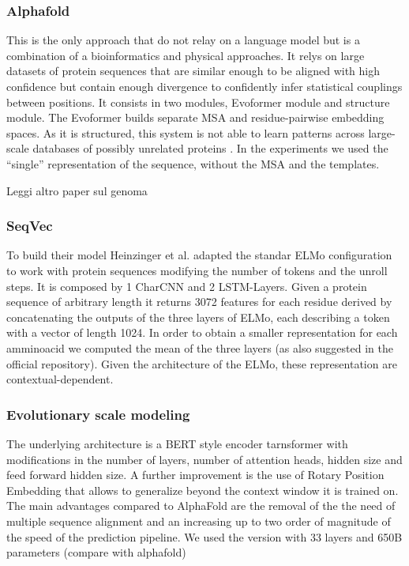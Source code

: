 \documentclass[12pt, letterpaper, twocolumn]{article}
\begin{document}
\subsubsection{Alphafold \cite{jumper2021highly}}
This is the only approach that do not relay on a language model but is a combination of a bioinformatics and physical approaches.
It relys on large datasets of protein sequences that are similar enough to be aligned with high confidence but contain enough divergence to confidently infer statistical couplings between positions. It consists in two modules, Evoformer module and structure module. The Evoformer builds separate MSA and residue-pairwise embedding spaces. As it is structured, this system is not able to learn patterns across large-scale databases of possibly unrelated proteins \cite{bepler2021learning}.
In the experiments we used the ``single'' representation of the sequence, without the MSA and the templates.

Leggi altro paper sul genoma

\subsubsection{SeqVec \cite{heinzinger2019modeling} }
To build their model Heinzinger et al.\cite{heinzinger2019modeling} adapted the standar ELMo configuration \cite{peters-etal-2018-deep} to work with protein sequences modifying the number of tokens and the unroll steps. It is composed by 1 CharCNN and 2 LSTM-Layers. Given a protein sequence of arbitrary length it returns 3072 features for each residue derived by concatenating the outputs of the three layers of ELMo, each describing a token with a vector of length 1024. In order to obtain a smaller representation for each amminoacid we computed the mean of the three layers (as also suggested in the official repository). Given the architecture of the ELMo, these representation are contextual-dependent.


\subsubsection{Evolutionary scale modeling \cite{lin2023evolutionary}}
The underlying architecture is a BERT \cite{devlin2018bert} style encoder tarnsformer with modifications in the number of layers, number of attention heads, hidden size and feed forward hidden size. A further improvement is the use of Rotary Position Embedding \cite{su2021roformer} that allows to generalize beyond the context window it is trained on.
The main advantages compared to AlphaFold are the removal of the the need of multiple sequence alignment and an increasing up to two order of magnitude of  the speed of the prediction pipeline.
We used the version with 33 layers and 650B parameters (compare with alphafold) 
\end{document}
